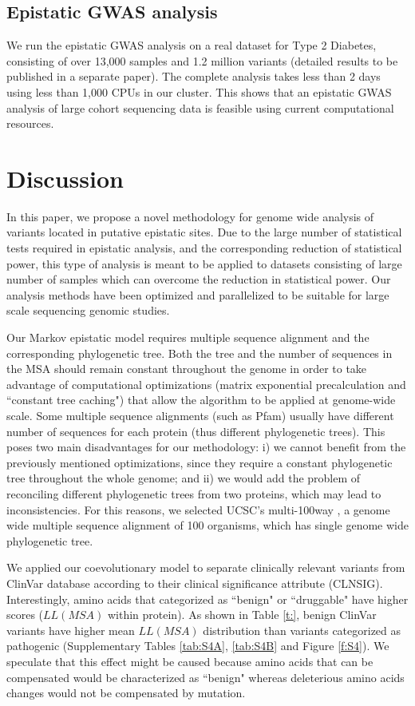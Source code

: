 \subsection{Epistatic GWAS analysis}

We run the epistatic GWAS analysis on a real dataset for Type 2 Diabetes, consisting of over 13,000 samples and 1.2 million variants (detailed results to be published in a separate paper). The complete analysis takes less than 2 days using less than 1,000 CPUs in our cluster. This shows that an epistatic GWAS analysis of large cohort sequencing data is feasible using current computational resources.

\section{Discussion}

In this paper, we propose a novel methodology for genome wide analysis of variants located in putative epistatic sites. Due to the large number of statistical tests required in epistatic analysis, and the corresponding reduction of statistical power, this type of analysis is meant to be applied to datasets consisting of large number of samples which can overcome the reduction in statistical power. Our analysis methods have been optimized and parallelized to be suitable for large scale sequencing genomic studies.

Our Markov epistatic model requires multiple sequence alignment and the corresponding phylogenetic tree. Both the tree and the number of sequences in the MSA should remain constant throughout the genome in order to take advantage of computational optimizations (matrix exponential precalculation and “constant tree caching") that allow the algorithm to be applied at genome-wide scale. Some multiple sequence alignments (such as Pfam) usually have different number of sequences for each protein (thus different phylogenetic trees). This poses two main disadvantages for our methodology: i) we cannot benefit from the previously mentioned optimizations, since they require a constant phylogenetic tree throughout the whole genome; and ii) we would add the problem of reconciling different phylogenetic trees from two proteins, which may lead to inconsistencies. For this reasons, we selected UCSC's multi-100way \cite{karolchik2014ucsc}, a genome wide multiple sequence alignment of 100 organisms, which has single genome wide phylogenetic tree.

We applied our coevolutionary model to separate clinically relevant variants from ClinVar database \cite{landrum2013clinvar} according to their clinical significance attribute (CLNSIG). Interestingly, amino acids that categorized as ``benign" or ``druggable" have higher scores ($LL(MSA)$ within protein). As shown in Table \ref{t:}, benign ClinVar variants have higher mean $LL(MSA)$ distribution than variants categorized as pathogenic (Supplementary Tables \ref{tab:S4A}, \ref{tab:S4B} and Figure \ref{f:S4}). We speculate that this effect might be caused because amino acids that can be compensated would be characterized as ``benign" whereas deleterious amino acids changes would not be compensated by mutation. 

